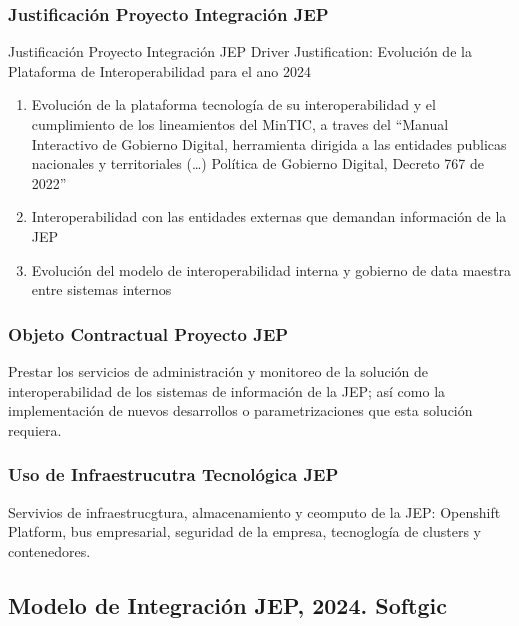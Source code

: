 \documentclass[
  paper=a4,
  ,captions=tableheading
]{scrartcl}
\providecommand{\tightlist}{%
  \setlength{\itemsep}{0pt}\setlength{\parskip}{0pt}}
\begin{document}
\subsubsection{Justificación Proyecto Integración
JEP}\label{sec:justificaciuxf3n-proyecto-integraciuxf3n-jep}

Justificación Proyecto Integración JEP \textbar{} Driver \textbar{}
Justification: Evolución de la Plataforma de Interoperabilidad para el
ano 2024

\begin{enumerate}
\def\labelenumi{\arabic{enumi}.}
\tightlist
\item
  Evolución de la plataforma tecnología de su interoperabilidad y el
  cumplimiento de los lineamientos del MinTIC, a traves del ``Manual
  Interactivo de Gobierno Digital, herramienta dirigida a las entidades
  publicas nacionales y territoriales (\ldots) Política de Gobierno
  Digital, Decreto 767 de 2022''
\item
  Interoperabilidad con las entidades externas que demandan información
  de la JEP
\item
  Evolución del modelo de interoperabilidad interna y gobierno de data
  maestra entre sistemas internos
\end{enumerate}

\subsubsection{Objeto Contractual Proyecto
JEP}\label{sec:objeto-contractual-proyecto-jep}

Prestar los servicios de administración y monitoreo de la solución de
interoperabilidad de los sistemas de información de la JEP; así como la
implementación de nuevos desarrollos o parametrizaciones que esta
solución requiera.

\subsubsection{Uso de Infraestrucutra Tecnológica
JEP}\label{sec:uso-de-infraestrucutra-tecnoluxf3gica-jep}

Servivios de infraestrucgtura, almacenamiento y ceomputo de la JEP:
Openshift Platform, bus empresarial, seguridad de la empresa,
tecnoglogía de clusters y contenedores.

\subsection{Modelo de Integración JEP, 2024.
Softgic}\label{sec:modelo-de-integraciuxf3n-jep-2024.-softgic}
\end{document}
